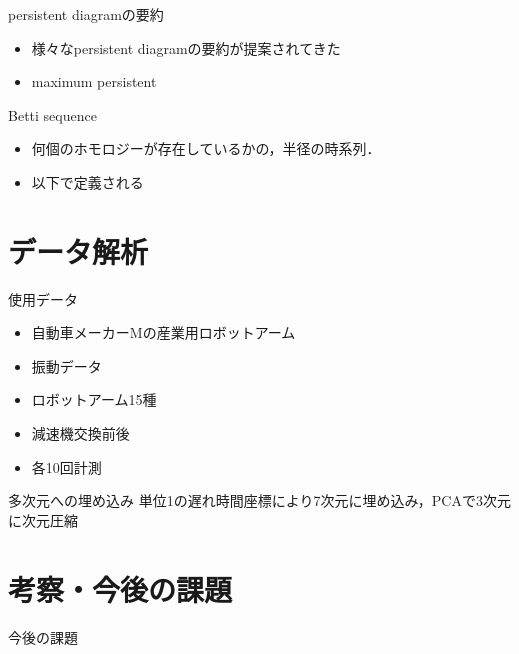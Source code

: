 \documentclass[dvipdfmx,cjk]{beamer}
\theoremstyle{example}
\begin{document}
\begin{frame}{persistent diagramの要約}
\begin{itemize}
\item 様々なpersistent diagramの要約が提案されてきた
\item maximum persistent
\end{itemize}
\end{frame}

\begin{frame}{Betti sequence}
\begin{itemize}
\item 何個のホモロジーが存在しているかの，半径の時系列．
\item 以下で定義される
\end{itemize}
\end{frame}

\section{データ解析}
\begin{frame}{使用データ}
\begin{itemize}
\item 自動車メーカーMの産業用ロボットアーム
\item 振動データ
\item ロボットアーム15種
\item 減速機交換前後
\item 各10回計測
\end{itemize}
\end{frame}

\begin{frame}{多次元への埋め込み}
単位1の遅れ時間座標により7次元に埋め込み，PCAで3次元に次元圧縮
\end{frame}

\begin{frame}

\end{frame}


\section{考察・今後の課題}

\begin{frame}{今後の課題}

\end{frame}
\end{document}
